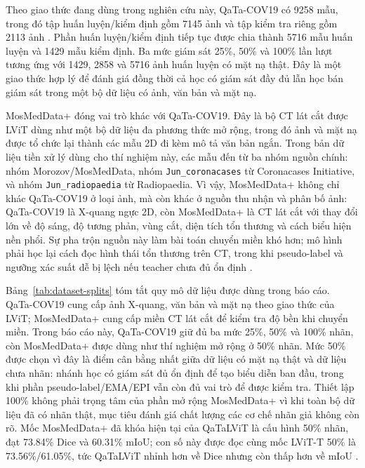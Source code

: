 Theo giao thức đang dùng trong nghiên cứu này, QaTa-COV19 có 9258 mẫu, trong đó tập huấn luyện/kiểm định gồm 7145 ảnh và tập kiểm tra riêng gồm 2113 ảnh \cite{degerli2022qatacov19}. Phần huấn luyện/kiểm định tiếp tục được chia thành 5716 mẫu huấn luyện và 1429 mẫu kiểm định. Ba mức giám sát 25\%, 50\% và 100\% lần lượt tương ứng với 1429, 2858 và 5716 ảnh huấn luyện có mặt nạ thật. Đây là một giao thức hợp lý để đánh giá đồng thời cả học có giám sát đầy đủ lẫn học bán giám sát trong một bộ dữ liệu có ảnh, văn bản và mặt nạ.

MosMedData+ đóng vai trò khác với QaTa-COV19. Đây là bộ CT lát cắt được LViT dùng như một bộ dữ liệu đa phương thức mở rộng, trong đó ảnh và mặt nạ được tổ chức lại thành các mẫu 2D đi kèm mô tả văn bản ngắn. Trong bản dữ liệu tiền xử lý dùng cho thí nghiệm này, các mẫu đến từ ba nhóm nguồn chính: nhóm Morozov/MosMedData, nhóm \texttt{Jun\_coronacases} từ Coronacases Initiative, và nhóm \texttt{Jun\_radiopaedia} từ Radiopaedia. Vì vậy, MosMedData+ không chỉ khác QaTa-COV19 ở loại ảnh, mà còn khác ở nguồn thu nhận và phân bố ảnh: QaTa-COV19 là X-quang ngực 2D, còn MosMedData+ là CT lát cắt với thay đổi lớn về độ sáng, độ tương phản, vùng cắt, diện tích tổn thương và cách biểu hiện nền phổi. Sự pha trộn nguồn này làm bài toán chuyển miền khó hơn; mô hình phải học lại cách đọc hình thái tổn thương trên CT, trong khi pseudo-label và ngưỡng xác suất dễ bị lệch nếu teacher chưa đủ ổn định \cite{li2023lvit,morozov2020mosmeddata,hofmanninger2020automatic}.

Bảng~\ref{tab:dataset-splits} tóm tắt quy mô dữ liệu được dùng trong báo cáo. QaTa-COV19 cung cấp ảnh X-quang, văn bản và mặt nạ theo giao thức của LViT; MosMedData+ cung cấp miền CT lát cắt để kiểm tra độ bền khi chuyển miền. Trong báo cáo này, QaTa-COV19 giữ đủ ba mức 25\%, 50\% và 100\% nhãn, còn MosMedData+ được dùng như thí nghiệm mở rộng ở 50\% nhãn. Mức 50\% được chọn vì đây là điểm cân bằng nhất giữa dữ liệu có mặt nạ thật và dữ liệu chưa nhãn: nhánh học có giám sát đủ ổn định để tạo biểu diễn ban đầu, trong khi phần pseudo-label/EMA/EPI vẫn còn đủ vai trò để được kiểm tra. Thiết lập 100\% không phải trọng tâm của phần mở rộng MosMedData+ vì khi toàn bộ dữ liệu đã có nhãn thật, mục tiêu đánh giá chất lượng các cơ chế nhãn giả không còn rõ. Mốc MosMedData+ đã khóa hiện tại của QaTaLViT là cấu hình 50\% nhãn, đạt 73.84\% Dice và 60.31\% mIoU; con số này được đọc cùng mốc LViT-T 50\% là 73.56\%/61.05\%, tức QaTaLViT nhỉnh hơn về Dice nhưng còn thấp hơn về mIoU \cite{li2023lvit,morozov2020mosmeddata,hofmanninger2020automatic}.

